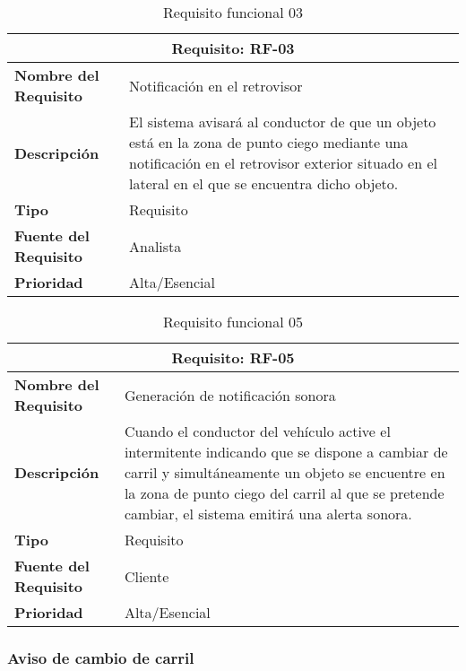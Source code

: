 \begin{table}[H]
\begin{center}
\begin{tabular}{p{} p{7cm}}
\multicolumn{2}{c}{\textbf{Requisito: RF-03} } \\
\hline \hline
\textbf{Nombre del Requisito} & Notificación en el retrovisor \\
\hline
\textbf{Descripción} & El sistema avisará al conductor de que un objeto está en la zona de punto ciego mediante una notificación en el retrovisor exterior situado en el lateral en el que se encuentra dicho objeto.\\
\hline
\textbf{Tipo} & Requisito  \\
\hline
\textbf{Fuente del Requisito} & Analista  \\
\hline
\textbf{Prioridad} & Alta/Esencial  \\ \hline
\end{tabular}
\caption{Requisito funcional 03}
\label{tab:RF-03}
\end{center}
\end{table}

\begin{table}[H]
\begin{center}
\begin{tabular}{p{} p{7cm}}
\multicolumn{2}{c}{\textbf{Requisito: RF-05} } \\
\hline \hline
\textbf{Nombre del Requisito} & Generación de notificación sonora \\
\hline
\textbf{Descripción} &  Cuando el conductor del vehículo active el intermitente indicando que se dispone a cambiar de carril y simultáneamente un objeto se encuentre en la zona de punto ciego del carril al que se pretende cambiar, el sistema emitirá una alerta sonora. \\
\hline
\textbf{Tipo} & Requisito  \\
\hline
\textbf{Fuente del Requisito} & Cliente  \\
\hline
\textbf{Prioridad} & Alta/Esencial  \\ \hline
\end{tabular}
\caption{Requisito funcional 05}
\label{tab:RF-05}
\end{center}
\end{table}


\subsubsection{Aviso de cambio de carril}

